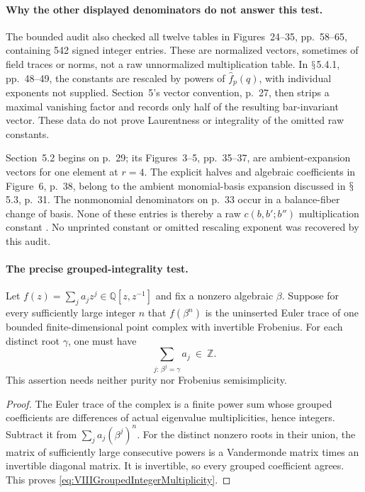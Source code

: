 \documentclass[11pt,a4paper]{article}
\newcommand{\Q}{\mathbb Q}\newcommand{\Z}{\mathbb Z}\newcommand{\C}{\mathbb C}\newcommand{\N}{\mathbb N}\newcommand{\F}{\mathbb F}
\renewcommand{\S}{\ensuremath{\mathsection}}
\theoremstyle{named}\newtheorem{finding}{Finding}[section]
\theoremstyle{definition}\newtheorem{definition}[finding]{Definition}
\theoremstyle{remark}\newtheorem{remark}[finding]{Remark}
\begin{document}
\paragraph{Why the other displayed denominators do not answer this test.}
The bounded audit also checked all twelve
tables in Figures~24--35, pp.~58--65,
containing 542 signed integer entries.
These are normalized vectors, sometimes of
field traces or norms, not a raw unnormalized
multiplication table.
In \S5.4.1, pp.~48--49, the constants are
rescaled by powers of \(\hat f_p(q)\), with
individual exponents not supplied.
Section~5's vector convention, p.~27, then
strips a maximal vanishing factor and records
only half of the resulting bar-invariant vector.
These data do not prove Laurentness or integrality
of the omitted raw constants.

Section~5.2 begins on p.~29; its
Figures~3--5, pp.~35--37, are ambient-expansion
vectors for one element at \(r=4\).
The explicit halves and algebraic coefficients
in Figure~6, p.~38, belong to the ambient
monomial-basis expansion discussed in
\S5.3, p.~31.
The nonmonomial denominators on p.~33 occur
in a balance-fiber change of basis.
None of these entries is thereby a raw
\(c(b,b';b'')\) multiplication constant
\cite{VIII}.
No unprinted constant or omitted rescaling
exponent was recovered by this audit.

\paragraph{The precise grouped-integrality test.}
Let \(f(z)=\sum_j a_jz^j\in\Q[z,z^{-1}]\)
and fix a nonzero algebraic \(\beta\).
Suppose for every sufficiently large integer \(n\)
that \(f(\beta^n)\) is the uninserted Euler
trace of one bounded finite-dimensional point
complex with invertible Frobenius.
For each distinct root \(\gamma\), one must have
\begin{equation}\label{eq:VIIIGroupedIntegerMultiplicity}
       \sum_{j:\,\beta^j=\gamma}a_j\ \in\ \Z.
\end{equation}
This assertion needs neither purity nor
Frobenius semisimplicity.

\begin{proof}
The Euler trace of the complex is a finite
power sum whose grouped coefficients are
differences of actual eigenvalue multiplicities,
hence integers. Subtract it from
\(\sum_j a_j(\beta^j)^n\).
For the distinct nonzero roots in their union,
the matrix of sufficiently large consecutive
powers is a Vandermonde matrix times an
invertible diagonal matrix. It is invertible,
so every grouped coefficient agrees.
This proves \eqref{eq:VIIIGroupedIntegerMultiplicity}.
\end{proof}
\end{document}
